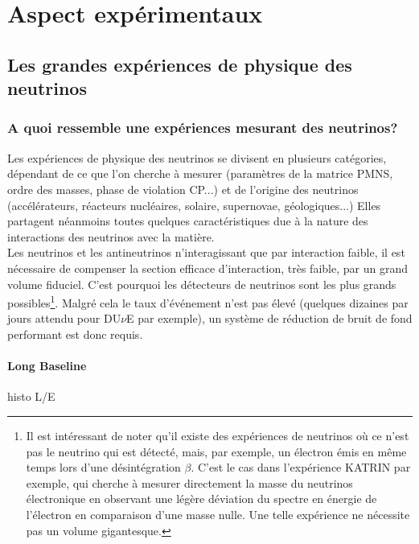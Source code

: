 \chapter{Aspect expérimentaux}


    \lipsum[1]
    \newpage
    \section{Les grandes expériences de physique des neutrinos}
        \subsection{A quoi ressemble une expériences mesurant des neutrinos?}
            Les expériences de physique des neutrinos se divisent en plusieurs catégories, dépendant de ce que l'on cherche à mesurer (paramètres de la matrice PMNS, ordre des masses, phase de violation CP...) et de l'origine des neutrinos (accélérateurs, réacteurs nucléaires, solaire, supernovae, géologiques...) Elles partagent néanmoins toutes quelques caractéristiques due à la nature des interactions des neutrinos avec la matière.\\
            
            Les neutrinos et les antineutrinos n'interagissant que par interaction faible, il est nécessaire de compenser la section efficace d'interaction, très faible, par un grand volume fiduciel. C'est pourquoi les détecteurs de neutrinos sont les plus grands possibles\footnote{Il est intéressant de noter qu'il existe des expériences de neutrinos où ce n'est pas le neutrino qui est détecté, mais, par exemple, un électron émis en même temps lors d'une désintégration $\beta$. C'est le cas dans l'expérience KATRIN\cite{katrin} par exemple, qui cherche à mesurer directement la masse du neutrinos électronique en observant une légère déviation du spectre en énergie de l'électron en comparaison d'une masse nulle. Une telle expérience ne nécessite pas un volume gigantesque.}. Malgré cela le taux d'événement n'est pas élevé (quelques dizaines par jours attendu pour DU$\nu$E par exemple\cite{dune_rate}), un système de réduction de bruit de fond performant est donc requis. 
            \subsubsection{Long Baseline}
                histo L/E
